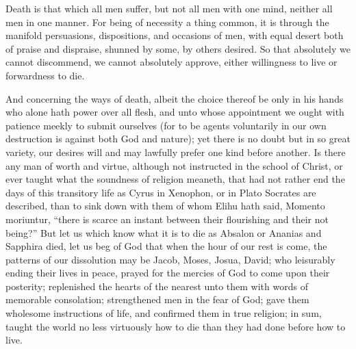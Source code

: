 Death is that which all men suffer, but not all men with one mind, neither all men in one manner. For being of necessity a thing common, it is through the manifold persuasions, dispositions, and occasions of men, with equal desert both of praise and dispraise, shunned by some, by others desired. So that absolutely we cannot discommend, we cannot absolutely approve, either willingness to live or forwardness to die.

And concerning the ways of death, albeit the choice thereof be only in his hands who alone hath power over all flesh, and unto whose appointment we ought with patience meekly to submit ourselves (for to be agents voluntarily in our own destruction is against both God and nature); yet there is no doubt but in so great variety, our desires will and may lawfully  prefer one kind before another.
 Is there any man of worth and virtue, although not instructed in the school of Christ, or ever taught what the soundness of religion meaneth, that had not rather end the days of this transitory life as Cyrus in Xenophon, or in Plato Socrates are described, than to sink down with them of whom Elihu hath said, Momento moriuntur, “there is scarce an instant between their flourishing and their not being?” But let us which know what it is to die as Absalon or Ananias and Sapphira died, let us beg of God that when the hour of our rest is come, the patterns of our dissolution may be Jacob, Moses, Josua, David; who leisurably ending their lives in peace, prayed for the mercies of God to come upon their posterity; replenished the hearts of the nearest unto them with words of memorable consolation; strengthened men in the fear of God; gave them wholesome instructions of life, and confirmed them in true religion; in sum, taught the world no less virtuously how to die than they had done before how to live.

